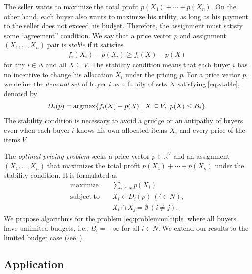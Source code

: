 \documentclass[letterpaper]{article}
\newcommand{\argmax}{\operatornamewithlimits{argmax}}
\theoremstyle{definition}
\newcommand{\COMM}[2]{{
\begin{CJK}{UTF8}{ipxm}
\ifthenelse{\equal{#1}{TM}}{\color{blue}}{
\ifthenelse{\equal{#1}{YK}}{\color{red}}{
\ifthenelse{\equal{#1}{HS}}{\color{cyan}}{
\ifthenelse{\equal{#1}{KK}}{\color{magenta}}}}}
[#1: #2]
\end{CJK}
}}
\begin{document}
The seller wants to maximize the total profit $p(X_1) + \cdots + p(X_n)$.
On the other hand, each buyer also wants to maximize his utility, as long as his payment to the seller does not exceed his budget.
Therefore, the assignment must satisfy some ``agreement'' condition.
We say that a price vector $p$ and assignment $(X_1, \ldots, X_n)$ pair is \emph{stable}
if it satisfies
\begin{align}
  \label{eq:stable}
  f_i(X_i) - p(X_i) \ge f_i(X) - p(X)
\end{align}
for any $i \in N$ and all $X \subseteq V$.
The stability condition means that each buyer $i$ has no incentive to change his allocation $X_i$ under the pricing $p$.
For a price vector $p$, we define the \emph{demand set} of buyer $i$ as a family of sets $X$ satisfying \eqref{eq:stable}, denoted by
\begin{align}\label{eq:demandset}
  D_i(p) = \argmax \{ f_i(X) - p(X) \mid X \subseteq V, \ p(X) \leq B_i \}.
\end{align}
The stability condition is necessary to avoid a grudge or an antipathy of buyers even when each buyer $i$ knows his own allocated items $X_i$ and every price of the items $V$.


The \emph{optimal pricing problem} %
seeks a price vector $p\in \mathbb{R}^V$ and an assignment $(X_1, \ldots, X_n)$ that maximizes the total profit $p(X_1) + \cdots + p(X_n)$ under the stability condition.
It is formulated as
\begin{align}
    \text{maximize}&\textstyle \quad \sum_{i\in N}p(X_i)  \nonumber \\
    \text{subject to}&\quad X_i \in D_i(p) ~(i \in N), \label{eq:problemmultiple} \\
    &\quad X_i \cap X_j = \emptyset ~(i \neq j). \nonumber
\end{align}
We propose algorithms for the problem \eqref{eq:problemmultiple} where all buyers have unlimited budgets, i.e., $B_i = +\infty$ for all $i \in N$.
We extend our results to the limited budget case (see~\cite{maehara2017optimal}).

\subsection{Application}
\label{subsec:budgetallocation}

\end{document}
